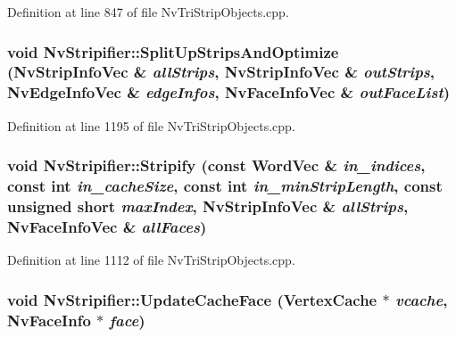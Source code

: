 Definition at line 847 of file NvTriStripObjects.cpp.\hypertarget{class_nv_stripifier_def493456c6deefa0f0ae8faf37a17e1}{
\subsubsection[{SplitUpStripsAndOptimize}]{\setlength{\rightskip}{0pt plus 5cm}void NvStripifier::SplitUpStripsAndOptimize ({\bf NvStripInfoVec} \& {\em allStrips}, \/  {\bf NvStripInfoVec} \& {\em outStrips}, \/  {\bf NvEdgeInfoVec} \& {\em edgeInfos}, \/  {\bf NvFaceInfoVec} \& {\em outFaceList})}}
\label{class_nv_stripifier_def493456c6deefa0f0ae8faf37a17e1}




Definition at line 1195 of file NvTriStripObjects.cpp.\hypertarget{class_nv_stripifier_aac47bf929630e54c53427fb1714816d}{
\subsubsection[{Stripify}]{\setlength{\rightskip}{0pt plus 5cm}void NvStripifier::Stripify (const {\bf WordVec} \& {\em in\_\-indices}, \/  const int {\em in\_\-cacheSize}, \/  const int {\em in\_\-minStripLength}, \/  const unsigned short {\em maxIndex}, \/  {\bf NvStripInfoVec} \& {\em allStrips}, \/  {\bf NvFaceInfoVec} \& {\em allFaces})}}
\label{class_nv_stripifier_aac47bf929630e54c53427fb1714816d}




Definition at line 1112 of file NvTriStripObjects.cpp.\hypertarget{class_nv_stripifier_bba4a460c63fc132708ccd05474caff0}{
\subsubsection[{UpdateCacheFace}]{\setlength{\rightskip}{0pt plus 5cm}void NvStripifier::UpdateCacheFace ({\bf VertexCache} $\ast$ {\em vcache}, \/  {\bf NvFaceInfo} $\ast$ {\em face})}}
\label{class_nv_stripifier_bba4a460c63fc132708ccd05474caff0}




